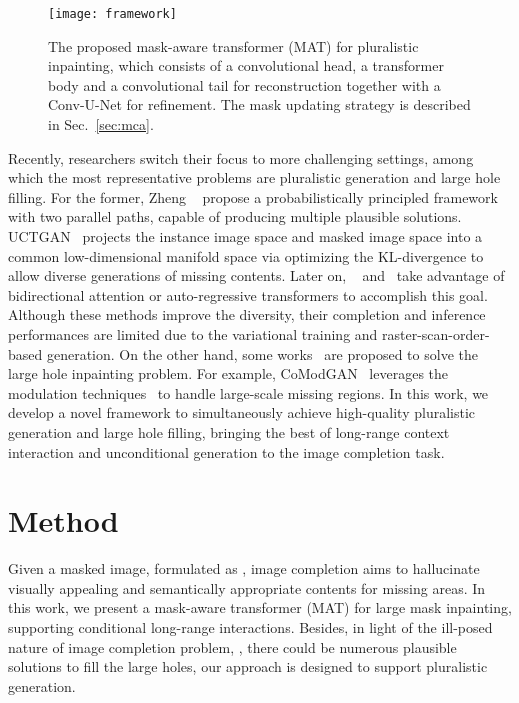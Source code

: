\documentclass[10pt,twocolumn,letterpaper]{article}
\begin{document}
	\begin{figure*}[t]
		\begin{center}
			\texttt{[image: framework]}
		\end{center}
		\vspace{-0.1in}
		\caption{The proposed mask-aware transformer (MAT) for pluralistic inpainting, which consists of a convolutional head, a transformer body and a convolutional tail for reconstruction together with a Conv-U-Net for refinement. The mask updating strategy is described in Sec.~\ref{sec:mca}.} \label{fig:framework}
		\vspace{-0.15in}
	\end{figure*}
	
	Recently, researchers switch their focus to more challenging settings, among which the most representative problems are pluralistic generation and large hole filling. For the former, Zheng \etal~\cite{zheng2019pluralistic} propose a probabilistically principled framework with two parallel paths, capable of producing multiple plausible solutions. UCTGAN~\cite{zhao2020uctgan} projects the instance image space and masked image space into a common low-dimensional manifold space via optimizing the KL-divergence to allow diverse generations of missing contents. Later on, ~\cite{wan2021high} and~\cite{yu2021diverse} take advantage of bidirectional attention or auto-regressive transformers to accomplish this goal. Although these methods improve the diversity, their completion and inference performances are limited due to the variational training and raster-scan-order-based generation. On the other hand, some works~\cite{ma2019region,zhao2020large,suvorov2021resolution,zheng2021tfill} are proposed to solve the large hole inpainting problem. For example, CoModGAN~\cite{zhao2020large} leverages the modulation techniques~\cite{chen2018self,karras2019style,karras2020analyzing} to handle large-scale missing regions. In this work, we develop a novel framework to simultaneously achieve high-quality pluralistic generation and large hole filling, bringing the best of long-range context interaction and unconditional generation to the image completion task.
	
\section{Method}
	\label{sec:method}
	
	Given a masked image, formulated as , image completion aims to hallucinate visually appealing and semantically appropriate contents for missing areas. In this work, we present a mask-aware transformer (MAT) for large mask inpainting, supporting conditional long-range interactions. 
	Besides, in light of the ill-posed nature of image completion problem, \ie, there could be numerous plausible solutions to fill the large holes, our approach is designed to support pluralistic generation.
	
\end{document}
